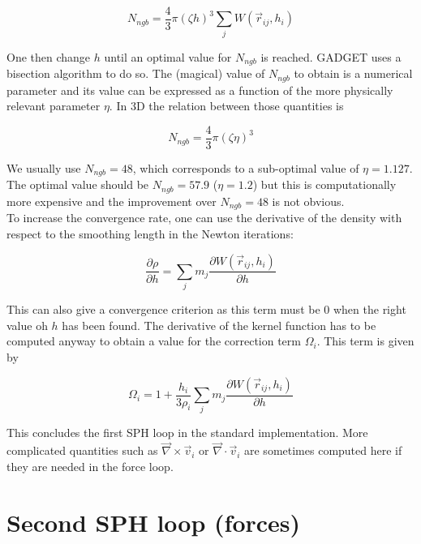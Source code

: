 \documentclass[a4paper,10pt]{report}
\begin{document}
\begin{equation}
 N_{ngb} = \frac{4}{3}\pi \left(\zeta h\right)^3 \sum_j W(\vec{r}_{ij},h_i)
\end{equation}

One then change $h$ until an optimal value for $N_{ngb}$ is reached. GADGET uses a bisection algorithm to do so.
The (magical) value of $N_{ngb}$ to obtain is a numerical parameter and its value can be expressed as a function of the
more physically relevant parameter $\eta$. In 3D the relation between those quantities is

\begin{equation}
 N_{ngb} = \frac{4}{3}\pi\left(\zeta \eta\right)^3
\end{equation}

We usually use $N_{ngb} = 48$, which corresponds to a sub-optimal value of $\eta=1.127$. The optimal value should be
$N_{ngb}=57.9$ ($\eta=1.2$) but this is computationally more expensive and the improvement over $N_{ngb}=48$ is not
obvious.\\ 

To increase the convergence rate, one can use the derivative of the density with respect to the smoothing length in the
Newton iterations:

\begin{equation}
 \frac{\partial \rho}{\partial h} = \sum_j m_j \frac{\partial W(\vec{r}_{ij},h_i)}{\partial h}
\end{equation}

This can also give a convergence criterion as this term must be $0$ when the right value oh $h$ has been found.
The derivative of the kernel function has to be computed anyway to obtain a value for the correction term $\Omega_i$.
This term is given by

\begin{equation}
  \Omega_i = 1 + \frac{h_i}{3\rho_i}\sum_j m_j\frac{\partial W(\vec{r}_{ij},h_i)}{\partial h}
\end{equation}

This concludes the first SPH loop in the standard implementation. More complicated quantities such as
$\vec\nabla\times\vec v_i$ or $\vec\nabla\cdot\vec v_i$ are sometimes computed here if they are needed in the force
loop.

\section{Second SPH loop (forces)}
\label{sec:forces}
\end{document}
